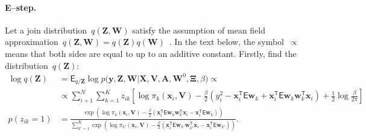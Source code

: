\documentclass[12pt, twoside]{article}
\begin{document}
\paragraph{E--step.} 
Let a join distribution~$q\left(\mathbf{Z}, \mathbf{W}\right)$ satisfy the assumption of mean field approximation~$q\left(\mathbf{Z}, \mathbf{W}\right) = q\left(\mathbf{Z}\right)q\left(\mathbf{W}\right)$~\cite{bishop2006}. 
In the text below, the symbol~$\propto$ means that both sides are equal to up to an additive constant.
Firstly, find the distribution~$q\left(\textbf{Z}\right)$:
\[
\label{eq:em:4}
\begin{aligned}
\log q\left(\textbf{Z}\right) &= \mathsf{E}_{q/\textbf{Z}} \log p\bigr(\mathbf{y}, \mathbf{Z}, \mathbf{W}|\mathbf{X}, \mathbf{V}, \textbf{A}, \textbf{W}^{0}, \bm{\Xi}, \beta\bigr)  \propto\\
&\propto \sum_{i+1}^{N}\sum_{k=1}^{K}z_{ik}\left[\log\pi_{k}\left(\textbf{x}_{i}, \textbf{V}\right) - \frac{\beta}{2}\left(y_{i}^{2} -\textbf{x}_{i}^{\mathsf{T}}\mathsf{E}\textbf{w}_{k} + \textbf{x}_{i}^{\mathsf{T}}\mathsf{E}\textbf{w}_{k}\textbf{w}_{k}^{\mathsf{T}}\textbf{x}_{i}\right) + \frac{1}{2}\log\frac{\beta}{2\pi}\right]\\
p\left(z_{ik} = 1\right) &= \frac{\exp\left(\log\pi_{k}\left(\textbf{x}_{i}, \textbf{V}\right) - \frac{\beta}{2}\left(\textbf{x}_{i}^{\mathsf{T}}\mathsf{E}\textbf{w}_{k}\textbf{w}_{k}^{\mathsf{T}}\textbf{x}_{i} - \textbf{x}_{i}^{\mathsf{T}}\mathsf{E}\textbf{w}_{k}\right)\right)}{\sum_{k'=1}^{K}\exp\left(\log\pi_{k'}\left(\textbf{x}_{i}, \textbf{V}\right) - \frac{\beta}{2}\left(\textbf{x}_{i}^{\mathsf{T}}\mathsf{E}\textbf{w}_{k'}\textbf{w}_{k'}^{\mathsf{T}}\textbf{x}_{i} - \textbf{x}_{i}^{\mathsf{T}}\mathsf{E}\textbf{w}_{k'}\right) \right)}.
\end{aligned}
\]
\end{document}
